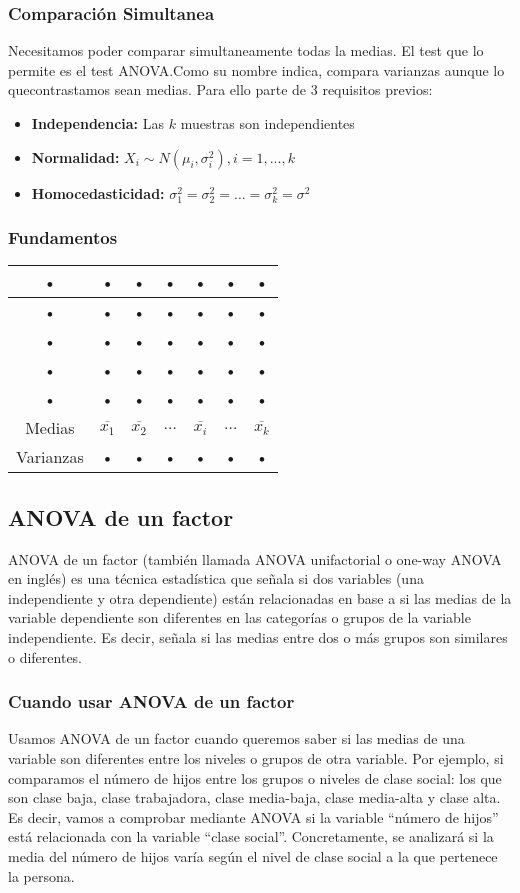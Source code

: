 \documentclass[10pt,letterpaper]{article}
\begin{document}
\subsubsection{Comparación Simultanea}
Necesitamos poder comparar simultaneamente todas la
medias. El test que lo permite es el test
ANOVA.Como su nombre indica, compara varianzas aunque lo quecontrastamos sean medias. Para ello parte de 3 requisitos previos:
\begin{itemize}
\item \textbf{Independencia:} Las $k$ muestras son independientes
\item \textbf{Normalidad:} $X_i\sim N(\mu_i,\sigma_{i}^2), i = 1,...,k$
\item \textbf{Homocedasticidad:} $\sigma_{1}^2=\sigma_{2}^2= \ldots =\sigma_{k}^2=\sigma^2$
\end{itemize}
\subsubsection{Fundamentos}\begin{center}

\begin{tabular}{|c|c|c|c|c|c|c|}
\hline 
• & • & • & • & • & • & • \\ 
\hline 
• & • & • & • & • & • & • \\ 
\hline 
• & • & • & • & • & • & • \\ 
\hline 
• & • & • & • & • & • & • \\ 
\hline 
• & • & • & • & • & • & • \\ 
\hline 
Medias & $\overline{x_1}$ & $\overline{x_2}$ & $\ldots$ & $\overline{x_i}$ & $\ldots$ & $\overline{x_k}$ \\ 
\hline 
Varianzas & • & • & • & • & • & • \\ 
\hline 
\end{tabular} 
\end{center}
\subsection{ANOVA de un factor}
ANOVA de un factor (también llamada ANOVA unifactorial o one-way ANOVA en inglés) es una técnica estadística que señala si dos variables (una independiente y otra dependiente) están relacionadas en base a si las medias de la variable dependiente son diferentes en las categorías o grupos de la variable independiente. Es decir, señala si las medias entre dos o más grupos son similares o diferentes.
\subsubsection{Cuando usar ANOVA de un factor}
Usamos ANOVA de un factor cuando queremos saber si las medias de una variable son diferentes entre los niveles o grupos de otra variable. Por ejemplo, si comparamos el número de hijos entre los grupos o niveles de clase social: los que son clase baja, clase trabajadora, clase media-baja, clase media-alta y clase alta. Es decir, vamos a comprobar mediante ANOVA si la variable “número de hijos” está relacionada con la variable “clase social”. Concretamente, se analizará si la media del número de hijos varía según el nivel de clase social a la que pertenece la persona.
\end{document}
